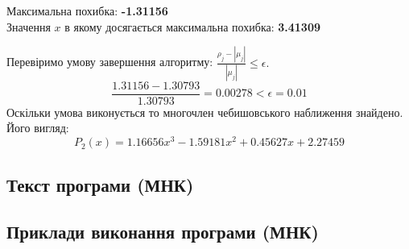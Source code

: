 \documentclass[ukrainian,14pt]{extarticle}
\begin{document}
\noindent
Максимальна похибка: \textbf{-1.31156}\\
Значення $x$ в якому досягається максимальна похибка: \textbf{3.41309}

\newpage

Перевіримо умову завершення алгоритму: $\frac{\rho_j - |\mu_j|}{|\mu_j|} \leq \epsilon.$ \\

$$\frac{1.31156 - 1.30793}{1.30793} = 0.00278 < \epsilon = 0.01$$
Оскільки умова виконується  то многочлен чебишовського наближення знайдено. Його вигляд:\\
$$P_2(x) = 1.16656 x^{3} - 1.59181 x^{2} + 0.45627 x + 2.27459$$


\newpage
\subsection{Текст програми (МНК)}


\newpage
\subsection{Приклади виконання програми (МНК)}
\end{document}
